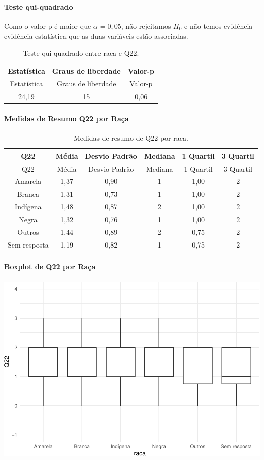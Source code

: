 \documentclass[]{article}
\let\oldparagraph\paragraph
\renewcommand{\paragraph}[1]{\oldparagraph{#1}\mbox{}}
\begin{document}
\hypertarget{teste-qui-quadrado-46}{%
\paragraph{Teste qui-quadrado}\label{teste-qui-quadrado-46}}

Como o valor-p é maior que \(\alpha=0,05\), não rejeitamos \(H_0\) e não temos evidência evidência estatística que as duas variáveis estão associadas.

\begin{longtable}[]{@{}ccc@{}}
\caption{\label{tab:unnamed-chunk-394}Teste qui-quadrado entre raca e Q22.}\tabularnewline
\toprule
Estatística & Graus de liberdade & Valor-p\tabularnewline
\midrule
\endfirsthead
\toprule
Estatística & Graus de liberdade & Valor-p\tabularnewline
\midrule
\endhead
24,19 & 15 & 0,06\tabularnewline
\bottomrule
\end{longtable}

\cleardoublepage

\hypertarget{medidas-de-resumo-q22-por-rauxe7a}{%
\paragraph{Medidas de Resumo Q22 por Raça}\label{medidas-de-resumo-q22-por-rauxe7a}}

\begin{longtable}[]{@{}cccccc@{}}
\caption{\label{tab:unnamed-chunk-395}Medidas de resumo de Q22 por raca.}\tabularnewline
\toprule
Q22 & Média & Desvio Padrão & Mediana & 1 Quartil & 3 Quartil\tabularnewline
\midrule
\endfirsthead
\toprule
Q22 & Média & Desvio Padrão & Mediana & 1 Quartil & 3 Quartil\tabularnewline
\midrule
\endhead
Amarela & 1,37 & 0,90 & 1 & 1,00 & 2\tabularnewline
Branca & 1,31 & 0,73 & 1 & 1,00 & 2\tabularnewline
Indígena & 1,48 & 0,87 & 2 & 1,00 & 2\tabularnewline
Negra & 1,32 & 0,76 & 1 & 1,00 & 2\tabularnewline
Outros & 1,44 & 0,89 & 2 & 0,75 & 2\tabularnewline
Sem resposta & 1,19 & 0,82 & 1 & 0,75 & 2\tabularnewline
\bottomrule
\end{longtable}

\hypertarget{boxplot-de-q22-por-rauxe7a}{%
\paragraph{Boxplot de Q22 por Raça}\label{boxplot-de-q22-por-rauxe7a}}

\begin{center}\includegraphics[width=0.75\linewidth]{relatorio_files/figure-latex/unnamed-chunk-396-1} \end{center}
\end{document}
